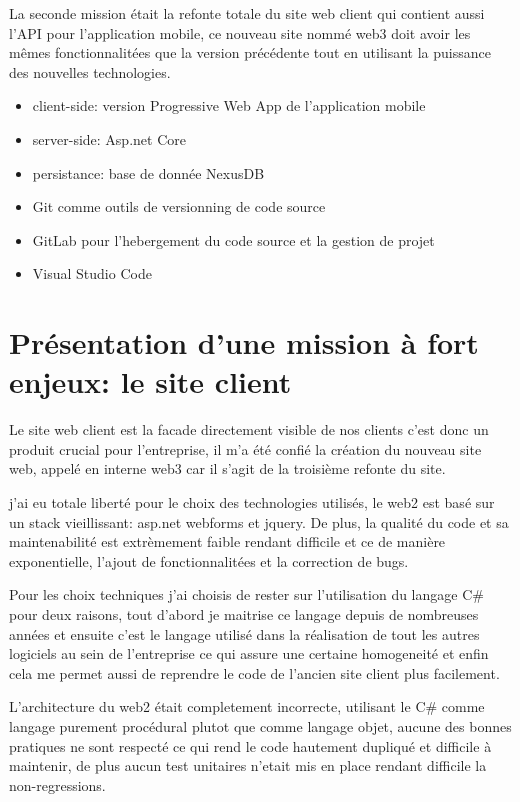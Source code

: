La seconde mission était la refonte totale du site web client qui contient aussi l'API pour 
l'application mobile, ce nouveau site nommé web3 doit avoir les mêmes fonctionnalitées que 
la version précédente tout en utilisant la puissance des nouvelles technologies. \newline

\begin{itemize}
    \item client-side: version Progressive Web App de l'application mobile 
    \item server-side: Asp.net Core 
    \item persistance: base de donnée NexusDB
    \item Git comme outils de versionning de code source 
    \item GitLab pour l'hebergement du code source et la gestion de projet 
    \item Visual Studio Code \newline
\end{itemize}



\section{Présentation d'une mission à fort enjeux: le site client}
Le site web client est la facade directement visible de nos clients c'est donc un produit crucial pour
l'entreprise, il m'a été confié la création du nouveau site web, appelé en interne web3 car il s'agit de la troisième
refonte du site.

j'ai eu totale liberté pour le choix des technologies utilisés, le web2 est basé sur un stack vieillissant: asp.net webforms et jquery.
De plus, la qualité du code et sa maintenabilité est extrèmement faible rendant difficile et ce de manière 
exponentielle, l'ajout de fonctionnalitées et la correction de bugs. 

Pour les choix techniques j'ai choisis de rester sur l'utilisation du langage C\# pour deux raisons, tout d'abord 
je maitrise ce langage depuis de nombreuses années et ensuite c'est le langage utilisé dans la réalisation de tout les 
autres logiciels au sein de l'entreprise ce qui assure une certaine homogeneité et enfin cela me permet 
aussi de reprendre le code de l'ancien site client plus facilement. \newline

L'architecture du web2 était completement incorrecte, utilisant le C\# comme langage purement procédural plutot que 
comme langage objet, aucune des bonnes pratiques ne sont respecté ce qui rend le code hautement dupliqué 
et difficile à maintenir, de plus aucun test unitaires n'etait mis en place rendant difficile la non-regressions.


